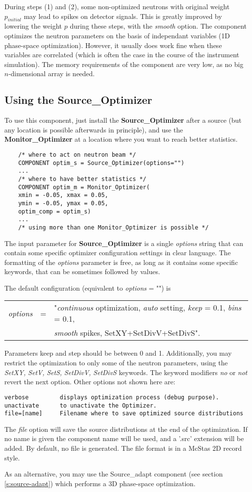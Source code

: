 During steps (1) and (2), some non-optimized neutrons with original
weight $p_{initial}$ may lead to spikes on detector signals. This is
greatly improved by lowering the weight $p$ during these steps, with the
{\it smooth} option.
The component optimizes the neutron parameters on the basis of
independant variables (1D phase-space optimization). However, it usually does work fine when these
variables are correlated (which is often the case in the course of the
instrument simulation).
The memory requirements of the component are very low, as no big
$n$-dimensional array is needed.

\subsection{Using the Source\_Optimizer}

To use this component, just install the {\bf Source\_Optimizer} after a
source (but any location is possible afterwards in principle), and use the {\bf
  Monitor\_Optimizer} at a location where you want to reach better
statistics.

\begin{verbatim}
    /* where to act on neutron beam */
    COMPONENT optim_s = Source_Optimizer(options="")
    ...
    /* where to have better statistics */
    COMPONENT optim_m = Monitor_Optimizer(
    xmin = -0.05, xmax = 0.05,
    ymin = -0.05, ymax = 0.05,
    optim_comp = optim_s)
    ...
    /* using more than one Monitor_Optimizer is possible */
\end{verbatim}

The input parameter for {\bf Source\_Optimizer} is a single {\it
  options} string that can contain some specific optimizer configuration
settings in clear language. The formatting of the {\it options}
parameter is free, as long as it contains some specific keywords, that
can be sometimes followed by values.

The default configuration (equivalent to {\it options} = "") is
\begin{center}
\begin{tabular}{rcl}
  {\it options} & = & "{\it continuous} optimization,
  {\it auto} setting, {\it keep} = 0.1, {\it bins} = 0.1, \\
  & & {\it smooth} spikes, SetXY+SetDivV+SetDivS".
\end{tabular}
\end{center}
Parameters keep and step should be between 0 and 1.
Additionally, you may restrict the optimization to only some of the neutron parameters, using the {\it SetXY, SetV, SetS, SetDivV, SetDivS} keywords.
The keyword modifiers {\it no} or {\it not} revert the next option.
Other options not shown here are:
\begin{verbatim}
verbose         displays optimization process (debug purpose).
unactivate      to unactivate the Optimizer.
file=[name]     Filename where to save optimized source distributions
\end{verbatim}
The {\it file} option will save the source distributions at the end of
the optimization. If no name is given the component name will be used,
and a '.src' extension will be added. By default, no file is generated.
The file format is in a McStas 2D record style.

As an alternative, you may use the Source\_adapt component
(see section \ref{s:source-adapt}) which performs
a 3D phase-space optimization.
